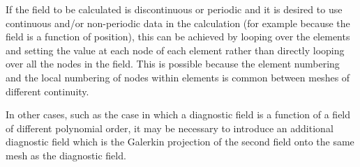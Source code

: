 If the field to be calculated is discontinuous or periodic and it is desired
to use continuous and/or non-periodic data in the calculation (for example
because the field is a function of position), this can be achieved by
looping over the elements and setting the value at each node of each
element rather than directly looping over all the nodes in the field. This
is possible because the element numbering and the local numbering of nodes within
elements is common between meshes of different continuity. 

In other cases, such as the case in which a diagnostic field is a function
of a field of different polynomial order, it may be necessary to introduce
an additional diagnostic field which is the Galerkin projection of the
second field onto the same mesh as the diagnostic field. 
